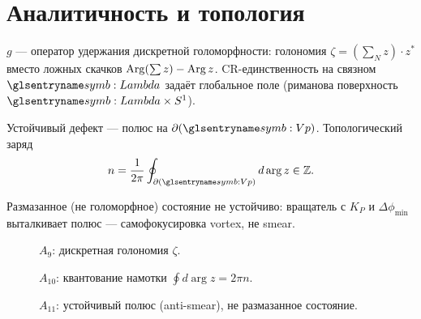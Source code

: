 \section{Аналитичность и топология}

\begin{axiom}
\label{ax:A9}
$g$ --- оператор удержания дискретной голоморфности: голономия $\zeta=(\sum_N z)\cdot z^*$
вместо ложных скачков $\operatorname{Arg}(\sum z)-\operatorname{Arg} z$.
CR-единственность на связном $\carrierLattice$ задаёт глобальное поле (риманова поверхность $\carrierLattice\times S^1$).
\end{axiom}

\begin{axiom}
\label{ax:A10}
Устойчивый дефект --- полюс на $\partial(\hv)$. Топологический заряд
\[
  n=\frac{1}{2\pi}\oint_{\partial(\hv)} d\arg z \in \mathbb{Z}.
\]
\end{axiom}

\begin{axiom}
\label{ax:A11}
Размазанное (не голоморфное) состояние не устойчиво: вращатель с $K_P$ и $\Delta\phi_{\min}$
выталкивает полюс --- самофокусировка vortex, не smear.
\end{axiom}

\begin{figure}[htbp]
  \centering
  
  \caption{$A_9$: дискретная голономия $\zeta$.}
  \label{fig:axiom-a9-holonomy}
\end{figure}

\begin{figure}[htbp]
  \centering
  
  \caption{$A_{10}$: квантование намотки $\oint d\arg z=2\pi n$.}
  \label{fig:axiom-a10-winding}
\end{figure}

\begin{figure}[htbp]
  \centering
  
  \caption{$A_{11}$: устойчивый полюс (anti-smear), не размазанное состояние.}
  \label{fig:axiom-a11-vortex}
\end{figure}

